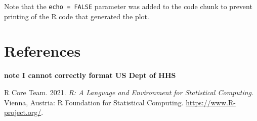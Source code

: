 \documentclass[
]{article}
\newlength{\cslhangindent}
\newlength{\cslentryspacingunit} %
\newenvironment{CSLReferences}[2] %
 {%
  \setlength{\parindent}{0pt}
  \ifodd #1
  \let\oldpar\par
  \def\par{\hangindent=\cslhangindent\oldpar}
  \fi
  \setlength{\parskip}{#2\cslentryspacingunit}
 }%
 {}
\begin{document}
Note that the \texttt{echo\ =\ FALSE} parameter was added to the code
chunk to prevent printing of the R code that generated the plot.

\newpage

\hypertarget{references-1}{%
\section{References}\label{references-1}}

\textbf{note I cannot correctly format US Dept of HHS}

\hypertarget{refs}{}
\begin{CSLReferences}{1}{0}
\leavevmode{}%
R Core Team. 2021. \emph{R: A Language and Environment for Statistical
Computing}. Vienna, Austria: R Foundation for Statistical Computing.
\url{https://www.R-project.org/}.

\end{CSLReferences}
\end{document}
